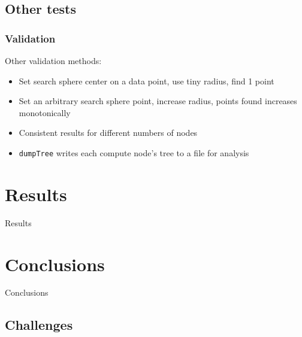 \documentclass[usernames,dvipsnames]{beamer}
\begin{document}
\subsection{Other tests}

\begin{frame}	
	\frametitle{Validation}
	
	\begin{block}{Other validation methods:}
		\begin{itemize}
			\item Set search sphere center on a data point, use tiny radius, find 1 point
			\item Set an arbitrary search sphere point, increase radius, points found increases monotonically
			\item Consistent results for different numbers of nodes
			\item \texttt{dumpTree} writes each compute node's tree to a file for analysis
		\end{itemize}
	\end{block}
	
\end{frame}




\section{Results}

\begin{frame}	
	\begin{Huge}
		\begin{center}
			Results
		\end{center}
	\end{Huge}
\end{frame}


\section{Conclusions}

\begin{frame}	
	\begin{Huge}
		\begin{center}
			Conclusions
		\end{center}
	\end{Huge}
\end{frame}

\subsection{Challenges}
\end{document}
